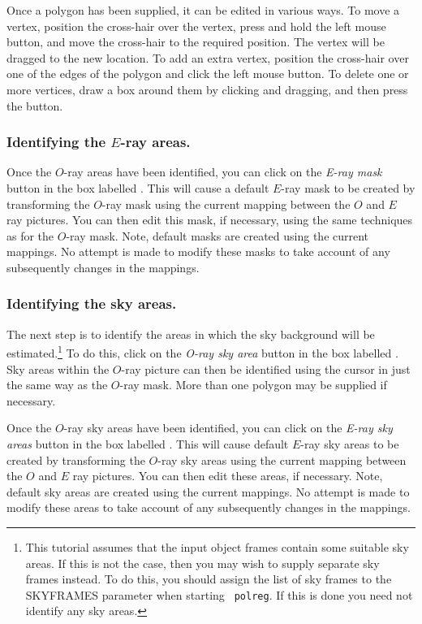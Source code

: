 Once a polygon has been supplied, it can be edited in various ways. To
move a vertex, position the cross-hair over the vertex, press and hold
the left mouse button, and move the cross-hair to the required position.
The vertex will be dragged to the new location. To add an extra vertex,
position the cross-hair over one of the edges of the polygon and click
the left mouse button. To delete one or more vertices, draw a box around 
them by clicking and dragging, and then press the  button.

\subsubsection {Identifying the $E$-ray areas.}
Once the $O$-ray areas have been identified, you can click on the {\em
E-ray mask} button in the box labelled . This will cause a default $E$-ray mask to be
created by transforming the $O$-ray mask using the current mapping
between the $O$ and $E$ ray pictures. You can then edit this mask, if
necessary, using the same techniques as for the $O$-ray mask. Note,
default masks are created using the current mappings. No attempt is made
to modify these masks to take account of any subsequently changes in
the mappings.

\subsubsection {Identifying the sky areas.}
The next step is to identify the areas in which the sky background will
be estimated.\footnote{This tutorial assumes that the input object frames
contain some suitable sky areas. If this is not the case, then you may
wish to supply separate sky frames instead. To do this, you should assign
the list of sky frames to the SKYFRAMES parameter when starting {\tt
polreg}. If this is done you need not identify any sky areas.} 
To do this, click on the {\em O-ray sky area} button in the box
labelled . Sky areas within
the $O$-ray picture can then be identified using the cursor in just the 
same way as the $O$-ray mask. More than one polygon may be supplied if
necessary. 

Once the $O$-ray sky areas have been identified, you can click on the
{\em E-ray sky areas} button in the box labelled . This will cause default $E$-ray sky areas to
be created by transforming the $O$-ray sky areas using the current
mapping between the $O$ and $E$ ray pictures. You can then edit these
areas, if necessary. Note, default sky areas are created using the
current mappings. No attempt is made to modify these areas to take
account of any subsequently changes in the mappings.

